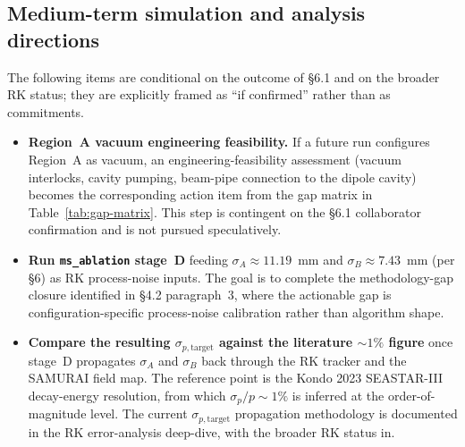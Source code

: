 \documentclass[a4paper, 11pt]{article}
\begin{document}
\subsection{Medium-term simulation and analysis directions}
The following items are conditional on the outcome of §6.1 and on the broader RK status; they are explicitly framed as ``if confirmed'' rather than as commitments.
\begin{itemize}
  \item \textbf{Region~A vacuum engineering feasibility.} If a future run configures Region~A as vacuum, an engineering-feasibility assessment (vacuum interlocks, cavity pumping, beam-pipe connection to the dipole cavity) becomes the corresponding action item from the gap matrix in Table~\ref{tab:gap-matrix}. This step is contingent on the §6.1 collaborator confirmation and is not pursued speculatively.
  \item \textbf{Run \texttt{ms\_ablation} stage~D} feeding $\sigma_A \approx 11.19$~mm and $\sigma_B \approx 7.43$~mm (per §6) as RK process-noise inputs. The goal is to complete the methodology-gap closure identified in §4.2 paragraph~3, where the actionable gap is configuration-specific process-noise calibration rather than algorithm shape.
  \item \textbf{Compare the resulting $\sigma_{p,\text{target}}$ against the literature $\sim 1\%$ figure} once stage~D propagates $\sigma_A$ and $\sigma_B$ back through the RK tracker and the SAMURAI field map. The reference point is the Kondo 2023 SEASTAR-III decay-energy resolution, from which $\sigma_p/p \sim 1\%$ is inferred at the order-of-magnitude level. The current $\sigma_{p,\text{target}}$ propagation methodology is documented in the RK error-analysis deep-dive, with the broader RK status in.
\end{itemize}
\end{document}
